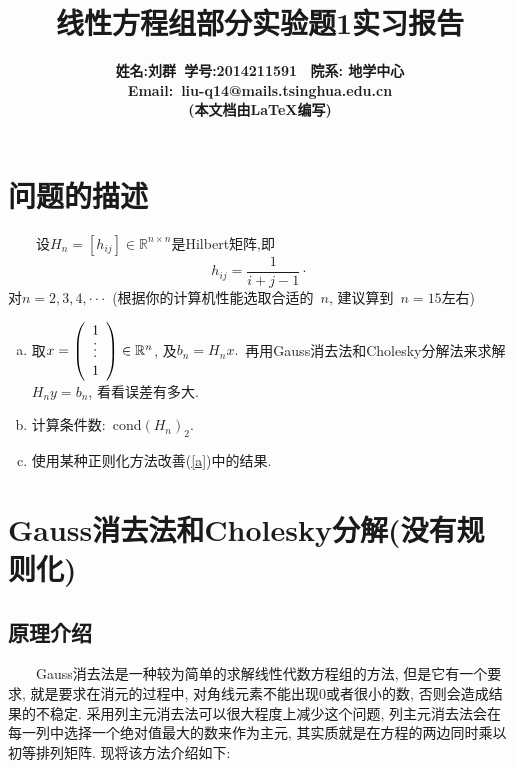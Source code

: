 \documentclass[a4paper]{article}
\begin{document}
\begin{CJK*}{GBK}{song}
\title{\bf{线性方程组部分实验题1实习报告}}
\author{\bf{姓名:刘群\ 学号:2014211591 \ 院系: 地学中心}\\ \bf{Email}:\ liu-q14@mails.tsinghua.edu.cn \\ (本文档由\LaTeX{}编写)}
\maketitle


\section{问题的描述}
\ \ \ \ 设$H_n=[h_{ij}] \in \mathbb{R}^{n \times n}$是Hilbert矩阵,即 $$h_{ij}=\frac{1}{i+j-1}\cdot$$
对$n=2,3,4,\cdot \cdot \cdot$\ (根据你的计算机性能选取合适的\ $n$, 建议算到\ $n = 15$左右)\\

\begin{enumerate}[(a)]
\item 取$x=\left(
\begin{array}{ccc}
1\\
\rotatebox{90}{$\cdots$} \\
1
\end{array}
\right) \in \mathbb{R}^n$, 及$b_n=H_n x.$\ 再用Gauss消去法和Cholesky分解法来求解$H_n y=b_n$, 看看误差有多大.\\ \label{a}
\item 计算条件数:\ cond$(H_n)_2.$ \\
\item 使用某种正则化方法改善(\ref{a})中的结果.
\end{enumerate}

\section{Gauss消去法和Cholesky分解(没有规则化)}
\subsection{原理介绍}

~~\ \ Gauss消去法是一种较为简单的求解线性代数方程组的方法, 但是它有一个要求, 就是要求在消元的过程中, 对角线元素不能出现0或者很小的数, 否则会造成结果的不稳定. 采用列主元消去法可以很大程度上减少这个问题, 列主元消去法会在每一列中选择一个绝对值最大的数来作为主元, 其实质就是在方程的两边同时乘以初等排列矩阵. 现将该方法介绍如下:



\end{CJK*}
\end{document}
